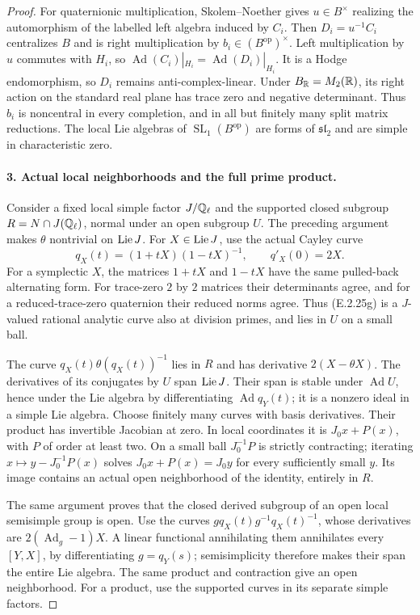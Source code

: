 \begin{proof}
For quaternionic multiplication, Skolem--Noether
gives \(u\in B^\times\) realizing the automorphism
of the labelled left algebra induced by \(C_i\).
Then \(D_i=u^{-1}C_i\) centralizes \(B\) and is
right multiplication by \(b_i\in(B^{\mathrm{op}})^\times\).
Left multiplication by \(u\) commutes with \(H_i\),
so \(\operatorname{Ad}(C_i)|_{H_i}
=\operatorname{Ad}(D_i)|_{H_i}\). It is a Hodge
endomorphism, so \(D_i\) remains anti-complex-linear.
Under \(B_\mathbb R=M_2(\mathbb R)\), its right action on the
standard real plane has trace zero and negative
determinant. Thus \(b_i\) is noncentral in every
completion, and in all but finitely many split
matrix reductions. The local Lie algebras of
\(\operatorname{SL}_1(B^{\mathrm{op}})\) are forms
of \(\mathfrak{sl}_2\) and are simple in
characteristic zero.

\paragraph{3. Actual local neighborhoods and the full prime product.}
Consider a fixed local simple factor \(J/\mathbb Q_\ell\)
and the supported closed subgroup
\(R=N\cap J(\mathbb Q_\ell)\), normal under an open
subgroup \(U\). The preceding argument makes
\(\theta\) nontrivial on \(\operatorname{Lie} J\). For
\(X\in\operatorname{Lie} J\), use the actual Cayley curve
\[
 q_X(t)=(1+tX)(1-tX)^{-1},\qquad q'_X(0)=2X.
 \tag{E.2.25g}
\]
For a symplectic \(X\), the matrices \(1+tX\)
and \(1-tX\) have the same pulled-back alternating
form. For trace-zero \(2\) by \(2\) matrices
their determinants agree, and for a reduced-trace-zero
quaternion their reduced norms agree. Thus (E.2.25g)
is a \(J\)-valued rational analytic curve also at
division primes, and lies in \(U\) on a small ball.

The curve \(q_X(t)\theta(q_X(t))^{-1}\) lies in
\(R\) and has derivative \(2(X-\theta X)\).
The derivatives of its conjugates by \(U\) span
\(\operatorname{Lie} J\). Their span is stable under
\(\operatorname{Ad}U\), hence under the Lie
algebra by differentiating \(\operatorname{Ad}q_Y(t)\);
it is a nonzero ideal in a simple Lie algebra.
Choose finitely many curves with basis derivatives.
Their product has invertible Jacobian at zero.
In local coordinates it is \(J_0x+P(x)\), with
\(P\) of order at least two. On a small ball
\(J_0^{-1}P\) is strictly contracting; iterating
\(x\mapsto y-J_0^{-1}P(x)\) solves
\(J_0x+P(x)=J_0y\) for every sufficiently small
\(y\). Its image contains an actual open
neighborhood of the identity, entirely in \(R\).

The same argument proves that the closed derived
subgroup of an open local semisimple group is open.
Use the curves
\(gq_X(t)g^{-1}q_X(t)^{-1}\), whose derivatives are
\(2(\operatorname{Ad}_g-1)X\). A linear functional
annihilating them annihilates every \([Y,X]\),
by differentiating \(g=q_Y(s)\); semisimplicity
therefore makes their span the entire Lie algebra.
The same product and contraction give an open
neighborhood. For a product, use the supported
curves in its separate simple factors.


\end{proof}
